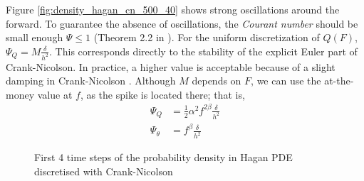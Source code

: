 \documentclass[]{rAMF2e}
\begin{document}
Figure \ref{fig:density_hagan_cn_500_40} shows strong oscillations around the forward. To guarantee the absence of oscillations, the \emph{Courant number}  should be small enough $\Psi \leq 1$ (Theorem 2.2 in \cite{morton2005numerical}). For the uniform discretization of $Q(F)$, $\Psi_Q = M \frac{\delta}{h^2}$. This corresponds directly to the stability of the explicit Euler part of Crank-Nicolson. In practice, a higher value is acceptable because of a slight damping in Crank-Nicolson \citep{lawson1978extrapolation}. Although $M$ depends on $F$, we can use the at-the-money value at $f$, as the spike is located there; that is, 
\begin{align}
\Psi_Q &= \frac{1}{2} \alpha^2 f^{2\beta} \frac{\delta}{h^2} \\
\Psi_{\theta} &= f^{\beta}\frac{\delta}{h^2} 
\end{align} 

\begin{figure}[htb]
  \begin{center}  
  \end{center}
     \caption{\label{fig:density_hagan_500_40_5} First 4 time steps of the probability density in Hagan PDE discretised with Crank-Nicolson}
\end{figure}
\end{document}
